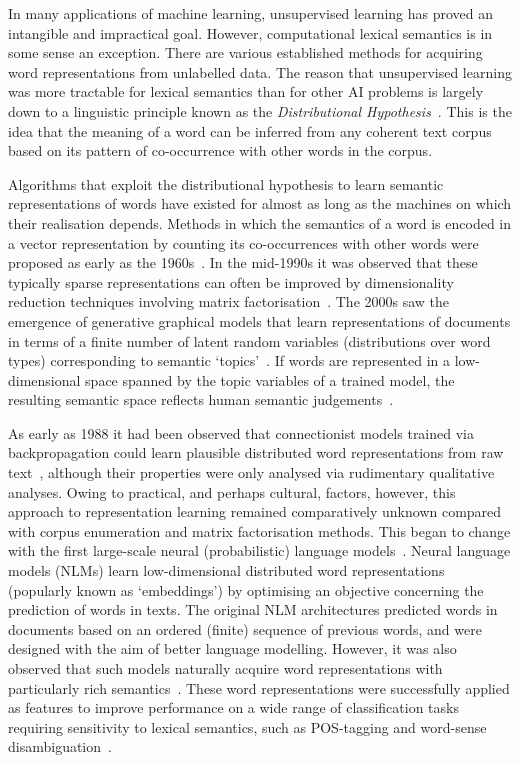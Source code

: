\label{CH2}

In many applications of machine learning, unsupervised learning has proved an intangible and impractical goal. However, computational lexical semantics is in some sense an exception. There are various established methods for acquiring word representations from unlabelled data. The reason that unsupervised learning was more tractable for lexical semantics than for other AI problems is largely down to a linguistic principle known as the \emph{Distributional Hypothesis}~\citep{dist}. This is the idea that the meaning of a word can be inferred from any coherent text corpus based on its pattern of co-occurrence with other words in the corpus. 

Algorithms that exploit the distributional hypothesis to learn semantic representations of words have existed for almost as long as the machines on which their realisation depends. Methods in which the semantics of a word is encoded in a vector representation by counting its co-occurrences with other words were proposed as early as the 1960s~\citep{cordier1965,harper1965}. In the mid-1990s it was observed that these typically sparse representations can often be improved by dimensionality reduction techniques involving matrix factorisation~\citep{landauer1997solution}. The 2000s saw the emergence of generative graphical models that learn representations of documents in terms of a finite number of latent random variables (distributions over word types) corresponding to semantic `topics'~\citep{blei2003latent}. If words are represented in a low-dimensional space spanned by the topic variables of a trained model, the resulting semantic space reflects human semantic judgements~\citep{griffiths2007topics}. 

As early as 1988 it had been observed that connectionist models trained via backpropagation could learn plausible distributed word representations from raw text~\cite{miikkulainen1989encoding}, although their properties were only analysed via rudimentary qualitative analyses. Owing to practical, and perhaps cultural, factors, however, this approach to representation learning remained comparatively unknown compared with corpus enumeration and matrix factorisation methods. This began to change with the first large-scale neural (probabilistic) language models~\citep{bengio2003neural}. Neural language models (NLMs) learn low-dimensional distributed word representations (popularly known as `embeddings') by optimising an objective concerning the prediction of words in texts. The original NLM architectures predicted words in documents based on an ordered (finite) sequence of previous words, and were designed with the aim of better language modelling. However, it was also observed that such models naturally acquire word representations with particularly rich semantics~\citep{collobert2008unified}. These word representations were successfully applied as features to improve performance on a wide range of classification tasks requiring sensitivity to lexical semantics, such as POS-tagging and word-sense disambiguation~\citep{collobert2008unified}. 

